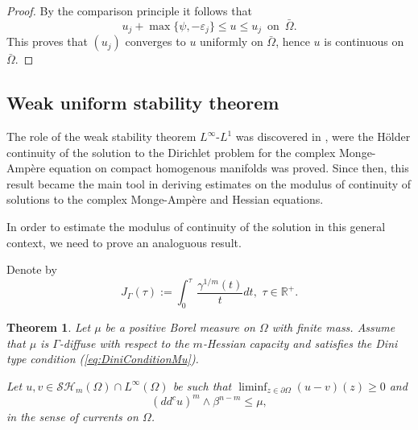 \documentclass[12pt]{amsart}
\newtheorem{theorem}{Theorem}
\theoremstyle{definition}
\numberwithin{theorem}{section}
\numberwithin{equation}{section}
\newcommand{\R}{\mathbb{R}}
\begin{document}
{\begin{proof}
By the comparison principle it follows that 
$$u_j + \max \{\psi,-\varepsilon_ j\} \leq u \leq u_j \, \, \, \text{on} \, \, \,  \bar{\Omega}.
$$ 
This proves that $(u_j)$ converges   to $u$ uniformly on $\bar{\Omega}$, hence $u$ is continuous on $\bar{\Omega}$.
\end{proof}
 
\subsection{Weak uniform stability theorem}
The role of the weak stability theorem $L^{\infty}$-$L^{1}$ was discovered  in \cite{EGZ09}, were  the H\"older continuity of the solution to the Dirichlet problem for the complex Monge-Amp\`ere equation on compact homogenous manifolds was proved. Since then, this result became the main tool in deriving estimates on the modulus of continuity of solutions to  the complex Monge-Amp\`ere and Hessian equations.

In order to estimate the modulus of continuity of the solution in this general context, we need to prove an analoguous result.

Denote by
\begin{equation} \label{eq:integral-mu}
J_\Gamma  (\tau) := \int_0^\tau \, \frac{\gamma^{ 1 \slash m} (t)}{t } d t, \, \, \tau \in \R^+.
\end{equation}

\begin{theorem} \label{thm:stability} Let  $\mu$ be a positive  Borel measure on $\Omega$ with finite mass. Assume that $\mu$ is $\Gamma$-diffuse  with respect to the $m$-Hessian capacity and  satisfies the  Dini type condition (\ref{eq:DiniConditionMu}).

Let   $u, v\in \mathcal{SH}_m (\Omega) \cap L^{\infty} (\Omega)$ be  such that $ \liminf_{z\in\partial\Omega}(u-v)(z)\geq 0 $ and
$$
 (dd^c u)^m \wedge \beta^{n-m} \leq \mu,
$$
 in the sense of currents on $\Omega$. 
 

\end{theorem}}
\end{document}
